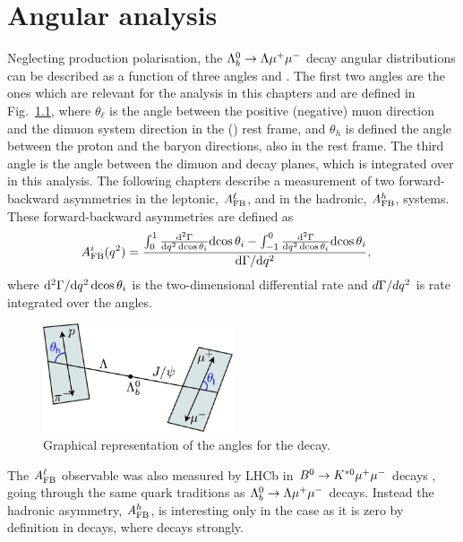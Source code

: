 \chapter{Angular analysis}
\label{sec:ang_ana}

Neglecting \Lb production polarisation, the $\Lambda^0_b\rightarrow\Lambda\mu^+\mu^-$ decay angular distributions can be described 
as a function of three angles and \qsq. The first two angles are the ones which are relevant for the
analysis in this chapters and are defined in Fig.~\ref{fig:Lb_angles}, where $\theta_\ell$ is the angle between 
the positive (negative) muon direction and the dimuon system direction in the \Lb (\Lbbar) rest frame,
and $\theta_h$ is defined the angle between the proton and the \Lz baryon directions, also in the
\Lb rest frame. The third angle is the angle between the dimuon and \Lz decay planes, which is integrated
over in this analysis. %
The following chapters describe a measurement of two forward-backward asymmetries in the leptonic,
$A_{\rm FB}^\ell$, and in the hadronic, $A_{\rm FB}^h$, systems. These forward-backward asymmetries
are defined as
\begin{align}
A_{\rm FB}^i(q^2)&=\frac{\int_0^1 \frac{\mathrm{d}^2\Gamma}{\mathrm{d}q^2\,\mathrm{d}\!\cos\theta_i} \mathrm{d}\!\cos\theta_i-
               \int^0_{-1} \frac{\mathrm{d}^2\Gamma}{\mathrm{d}q^2\,\mathrm{d}\!\cos\theta_i} \mathrm{d}\!\cos\theta_i}{\mathrm{d}\Gamma / \mathrm{d} q^2},
\label{eq:afbTh}
\end{align}
where $\mathrm{d}^2\Gamma/\mathrm{d} q^2\,\mathrm{d}\!\cos\theta_i$ is the two-dimensional differential rate and
$d\Gamma / dq^2$ is rate integrated over the angles. 

\begin{figure}[h!]
\centering
\includegraphics[width=0.5\textwidth]{Lmumu/figs/angles.jpeg}
\caption{Graphical representation of the angles for the \decay{\Lb}{\Lz\mumu} decay.}
\label{fig:Lb_angles}
\end{figure}

The $A_{\rm FB}^\ell$ observable was also measured by LHCb in $B^0\rightarrow K^{*0}\mu^+\mu^-$ decays ,
going through the same quark traditions as $\Lambda^0_b\rightarrow\Lambda\mu^+\mu^-$ decays. Instead the hadronic
asymmetry, $A_{\rm FB}^h$, is interesting only in the \Lb case as it is zero by definition
in \Bz decays, where \Kstarz decays strongly.

